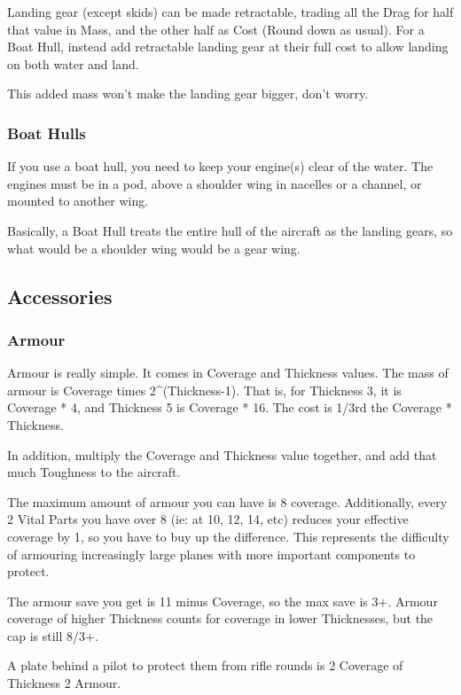 \documentclass{article}
\begin{document}
Landing gear (except skids) can be made retractable, trading all the
Drag for half that value in Mass, and the other half as Cost (Round down
as usual). For a Boat Hull, instead add retractable landing gear at
their full cost to allow landing on both water and land.

This added mass won't make the landing gear bigger, don't worry.

\subsubsection{Boat Hulls}
\label{_Boat_Hulls}

If you use a boat hull, you need to keep your engine(s) clear of the
water. The engines must be in a pod, above a shoulder wing in nacelles
or a channel, or mounted to another wing.

Basically, a Boat Hull treats the entire hull of the aircraft as the
landing gears, so what would be a shoulder wing would be a gear wing.

\subsection{Accessories}
\label{_Upgrades}

\subsubsection{Armour}
\label{_Armour}

Armour is really simple. It comes in Coverage and Thickness values. The
mass of armour is Coverage times 2\^{}(Thickness-1). That is, for
Thickness 3, it is Coverage * 4, and Thickness 5 is Coverage * 16. The
cost is 1/3rd the Coverage * Thickness.

In addition, multiply the Coverage and Thickness value together, and add
that much Toughness to the aircraft.

The maximum amount of armour you can have is 8 coverage.
Additionally, every 2 Vital Parts you have over 8 (ie: at 10, 12, 14,
etc) reduces your effective coverage by 1, so you have to buy up the
difference. This represents the difficulty of armouring increasingly
large planes with more important components to protect.

The armour save you get is 11 minus Coverage, so the max save is
3+. Armour coverage of higher Thickness counts for coverage in lower
Thicknesses, but the cap is still 8/3+.

A plate behind a pilot to protect them from rifle rounds is 2
Coverage of Thickness 2 Armour.
\end{document}
